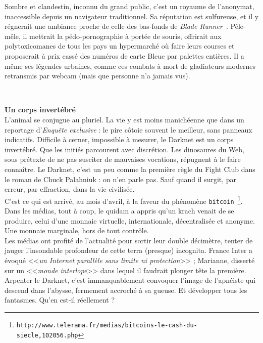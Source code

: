 \documentclass[11pt,twoside,a4paper]{article}
\begin{document}
\begin{minipage}[ht]{10.00cm}
	Sombre et clandestin, inconnu du grand public, c'est un royaume de l'anonymat, inaccessible depuis un navigateur traditionnel. Sa r{\'e}putation est sulfureuse, et il y r{\'e}gnerait une ambiance proche de celle des bas-fonds de \emph{Blade Runner~\footnotemark}. P{\^e}le-m{\^e}le, il mettrait la p{\'e}do-pornographie {\`a} port{\'e}e de souris, offrirait aux polytoxicomanes de tous les pays un hypermarch{\'e} o{\`u} faire leurs courses et proposerait {\`a} prix cass{\'e} des num{\'e}ros de carte Bleue par palettes enti{\`e}res. Il a m{\^e}me ses l{\'e}gendes urbaines, comme ces combats {\`a} mort de gladiateurs modernes retransmis par webcam (mais que personne n'a jamais vus). ~\\
\end{minipage}~\\

\textbf{\large Un corps invert{\'e}br{\'e}}~\\

L'animal se conjugue au pluriel. La vie y est moins manich{\'e}enne que dans un reportage d'\emph{Enqu{\^e}te exclusive} : le pire c{\^o}toie souvent le meilleur, sans panneaux indicatifs. Difficile {\`a} cerner, impossible {\`a} mesurer, le Darknet est un corps invert{\'e}br{\'e}. Que les initi{\'e}s parcourent avec discr{\'e}tion. Les dinosaures du Web, sous pr{\'e}texte de ne pas susciter de mauvaises vocations, r{\'e}pugnent {\`a} le faire conna{\^i}tre. Le Darknet, c'est un peu comme la premi{\`e}re r{\`e}gle du Fight Club dans le roman de Chuck Palahniuk : on n'en parle pas. Sauf quand il surgit, par erreur, par effraction, dans la vie civilis{\'e}e. ~\\

C'est ce qui est arriv{\'e}, au mois d'avril, {\`a} la faveur du ph{\'e}nom{\`e}ne \texttt{bitcoin~\footnote{\texttt{http://www.telerama.fr/medias/bitcoins-le-cash-du-siecle,102056.php}}}. Dans les m{\'e}dias, tout {\`a} coup, le quidam a appris qu'un krach venait de se produire, celui d'une monnaie virtuelle, internationale, d{\'e}centralis{\'e}e et anonyme. Une monnaie marginale, hors de tout contr{\^o}le. ~\\

Les m{\'e}dias ont profit{\'e} de l'actualit{\'e} pour sortir leur double d{\'e}cim{\`e}tre, tenter de jauger l'insondable profondeur de cette terra (presque) incognita. France Inter a {\'e}voqu{\'e} <<\emph{un Internet parall{\`e}le sans limite ni protection}>> ; Marianne, dissert{\'e} sur un <<\emph{monde interlope}>> dans lequel il faudrait plonger t{\^e}te la premi{\`e}re. Arpenter le Darknet, c'est immanquablement convoquer l'image de l'apn{\'e}iste qui descend dans l'abysse, fermement accroch{\'e} {\`a} sa gueuse. Et d{\'e}velopper tous les fantasmes. Qu'en est-il r{\'e}ellement ? ~\\
\end{document}
